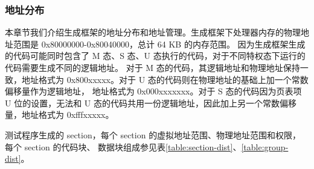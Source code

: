 \subsubsection{地址分布}

本章节我们介绍生成框架的地址分布和地址管理。生成框架下处理器内存的物理地址范围是 0x80000000-0x80040000，总计 64 KB 的内存范围。
因为生成框架生成的代码可能同时包含了 M 态、S 态、U 态执行的代码，对于不同特权态下运行的代码需要生成不同的逻辑地址。
对于 M 态的代码，其逻辑地址和物理地址保持一致，地址格式为 0x800xxxxx。对于 U 态的代码则在物理地址的基础上加一个常数偏移量作为逻辑地址，
地址格式为 0x000xxxxxxx。对于 S 态的代码因为页表项 U 位的设置，无法和 U 态的代码共用一份逻辑地址，因此加上另一个常数偏移量，地址格式为
0xfffxxxxx。\par

测试程序生成的 section，每个 section 的虚拟地址范围、物理地址范围和权限，每个 section 的代码块、
数据块组成参见表\ref{table:section-dist}、\ref{table:group-dist}。

